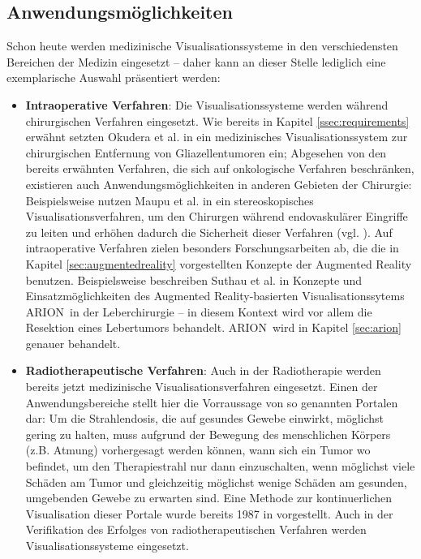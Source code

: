 \documentclass[ngerman,pdftex,paper=A4,DIV=calc,titlepage,12pt]{scrartcl}
\newtheorem[L]{boxedDefinition}{Definition}
\begin{document}
\subsection{Anwendungsmöglichkeiten}\label{ssec:applications}
Schon heute werden medizinische Visualisationssysteme in den verschiedensten Bereichen der Medizin eingesetzt -- daher kann an dieser Stelle lediglich eine exemplarische Auswahl präsentiert werden:
\begin{itemize}
 \item \textbf{Intraoperative Verfahren}: Die Visualisationssysteme werden während chirurgischen Verfahren eingesetzt. Wie bereits in Kapitel \ref{ssec:requirements} erwähnt setzten Okudera et al. in \cite{Okudera1994} ein medizinisches Visualisationssystem zur chirurgischen Entfernung von Gliazellentumoren ein;  Abgesehen von den bereits erwähnten Verfahren, die sich auf onkologische Verfahren beschränken, existieren auch Anwendungsmöglichkeiten in anderen Gebieten der Chirurgie: Beispielsweise nutzen Maupu et al. in \cite{Maupu2005} ein stereoskopisches Visualisationsverfahren, um den Chirurgen während endovaskulärer Eingriffe zu leiten und erhöhen dadurch die Sicherheit dieser Verfahren (vgl. \cite[Abstract]{Maupu2005}). Auf intraoperative Verfahren zielen besonders Forschungsarbeiten ab, die die in Kapitel \vref{sec:augmentedreality} vorgestellten Konzepte der Augmented Reality benutzen. Beispielsweise beschreiben Suthau et al. in \cite{Suthau2002DE}  Konzepte und Einsatzmöglichkeiten des Augmented Reality-basierten Visualisationssytems ARION\texttrademark\ in der Leberchirurgie -- in diesem Kontext wird vor allem die Resektion eines Lebertumors behandelt. ARION\texttrademark\ wird in Kapitel \vref{sec:arion} genauer behandelt.
 \item \textbf{Radiotherapeutische Verfahren}: Auch in der Radiotherapie werden bereits jetzt medizinische Visualisationsverfahren eingesetzt. Einen der Anwendungsbereiche stellt hier die Vorraussage von so genannten Portalen dar: Um die Strahlendosis, die auf gesundes Gewebe einwirkt, möglichst gering zu halten, muss aufgrund der Bewegung des menschlichen Körpers (z.B. Atmung) vorhergesagt werden können, wann sich ein Tumor wo befindet, um den Therapiestrahl nur dann einzuschalten, wenn möglichst viele Schäden am Tumor und gleichzeitig möglichst wenige Schäden am gesunden, umgebenden Gewebe zu erwarten sind. Eine Methode zur kontinuerlichen Visualisation dieser Portale wurde bereits 1987 in \cite{Leong1987} vorgestellt. Auch in der Verifikation des Erfolges von radiotherapeutischen Verfahren werden Visualisationssysteme eingesetzt.

\end{itemize}
\end{document}
